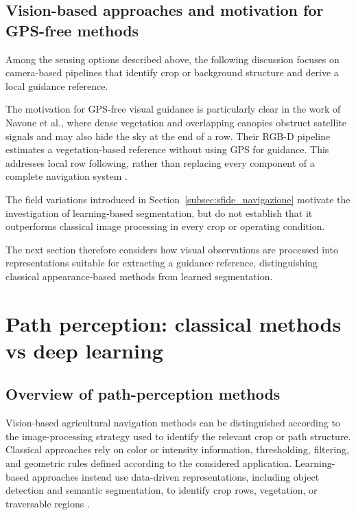 \subsection{Vision-based approaches and motivation for GPS-free methods}
\label{subsec:vision_based}

Among the sensing options described above, the following discussion
focuses on camera-based pipelines that identify crop or background
structure and derive a local guidance reference.

The motivation for GPS-free visual guidance is particularly clear in
the work of Navone et al., where dense vegetation and overlapping
canopies obstruct satellite signals and may also hide the sky at the end
of a row. Their RGB-D pipeline estimates a vegetation-based reference
without using GPS for guidance. This addresses local row following,
rather than replacing every component of a complete navigation system
\cite{navone2025gpsfree}.

The field variations introduced in
Section~\ref{subsec:sfide_navigazione} motivate the investigation of
learning-based segmentation,
but do not establish that it outperforms classical image processing in
every crop or operating condition.

The next section therefore considers how visual observations are
processed into representations suitable for extracting a guidance
reference, distinguishing classical appearance-based methods from
learned segmentation.

\section{Path perception: classical methods vs deep learning}
\label{sec:percezione_sentiero}

\subsection{Overview of path-perception methods}
\label{subsec:overview_path_perception}

Vision-based agricultural navigation methods can be distinguished
according to the image-processing strategy used to identify the relevant
crop or path structure. Classical approaches rely on color or intensity
information, thresholding, filtering, and geometric rules defined
according to the considered application. Learning-based approaches
instead use data-driven representations, including object detection and
semantic segmentation, to identify crop rows, vegetation, or traversable
regions \cite{bai2023vision}.

